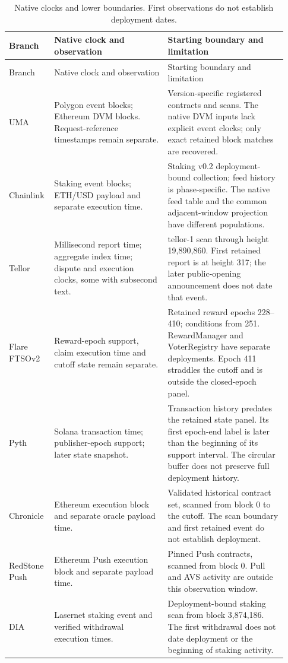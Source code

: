 \begingroup
\small\setlength{\tabcolsep}{5pt}\renewcommand{\arraystretch}{1.14}
\begin{longtable}{@{}L{0.13\linewidth} L{0.39\linewidth} L{0.41\linewidth}@{}}
\caption{Native clocks and lower boundaries. First observations do not establish deployment dates.}\label{tab:temporal_boundaries}\\
\toprule Branch & Native clock and observation & Starting boundary and limitation \\
\midrule\endfirsthead
\toprule Branch & Native clock and observation & Starting boundary and limitation \\
\midrule\endhead
UMA & Polygon event blocks; Ethereum DVM blocks. Request-reference timestamps remain separate. & Version-specific registered contracts and scans. The native DVM inputs lack explicit event clocks; only exact retained block matches are recovered. \\
Chainlink & Staking event blocks; ETH/USD  payload and separate execution time. & Staking v0.2 deployment-bound collection; feed history is phase-specific. The native feed table and the common adjacent-window projection have different populations. \\
Tellor & Millisecond report time; aggregate index time; dispute and execution clocks, some with subsecond text. & tellor-1 scan through height 19,890,860. First retained report is at height 317; the later public-opening announcement does not date that event. \\
Flare FTSOv2 & Reward-epoch support, claim execution time and cutoff state remain separate. & Retained reward epochs 228--410; conditions from 251. RewardManager and VoterRegistry have separate deployments. Epoch 411 straddles the cutoff and is outside the closed-epoch panel. \\
Pyth & Solana transaction time; publisher-epoch support; later state snapshot. & Transaction history predates the retained state panel. Its first epoch-end label is later than the beginning of its support interval. The circular buffer does not preserve full deployment history. \\
Chronicle & Ethereum execution block and separate oracle payload time. & Validated historical contract set, scanned from block 0 to the cutoff. The scan boundary and first retained event do not establish deployment. \\
RedStone Push & Ethereum Push execution block and separate payload time. & Pinned Push contracts, scanned from block 0. Pull and AVS activity are outside this observation window. \\
DIA & Lasernet staking event and verified withdrawal execution times. & Deployment-bound staking scan from block 3,874,186. The first withdrawal does not date deployment or the beginning of staking activity. \\
\bottomrule
\end{longtable}
\endgroup
